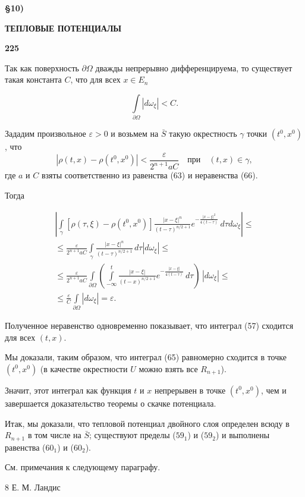 \documentclass[11pt, a4paper]{article}
\begin{document}
	\LARGE
	
	
	\begin{flushleft}
		\textbf{\S10)}
	\end{flushleft}
	
	\vspace*{-40pt}
	\begin{center}
		\textbf{ ТЕПЛОВЫЕ ПОТЕНЦИАЛЫ}\
	\end{center}
	
	\vspace*{-43pt}
	\begin{flushright}
		\textbf{225}
	\end{flushright}
	
	\vspace{0.1cm}
	Так как поверхность $\partial\Omega$ дважды непрерывно дифференцируема, то существует такая константа $C$, что для всех $x \in E_n$
	
	\begin{equation} \tag{66}
		\int\limits_{\partial\Omega} |d\omega_\xi| < C.
	\end{equation}
	
	Зададим произвольное $\varepsilon > 0$ и возьмем на $\bar{S}$ такую окрестность $\gamma$ точки $(t^0 , x^0 )$, что
	\[
	|\rho(t, x) - \rho(t^0 , x^0 )| < \frac{\varepsilon}{2^{n+1} aC} \quad \text{при} \quad (t, x) \in \gamma,
	\]
	 где $a$ и $C$ взяты соответственно из равенства (63) и неравенства (66).
	
	Тогда
	
	\begin{multline*}
		\left|\int\limits_{\gamma} [\rho(\tau, \xi) - \rho(t^0, x^0)]\frac{|x-\xi|^n}{(t-\tau)^{n/2+1}} e^{-\frac{|x-\xi|^2}{4(t-\tau)}} \, d\tau d\omega_\xi \right| \leq  \\
		\leq \frac{\varepsilon}{2^{n + 1}aC} \int\limits_{\gamma} \frac{|x-\xi|^n}{(t-\tau)^{n/2+1}} \, d\tau |d\omega_\xi| \leq \\
		\leq \frac{\varepsilon}{2^{n + 1}aC} \int\limits_{\partial\Omega} \left(\int\limits_{-\infty}^t \frac{|x - \xi|}{(t - x)^{n/2+1}}e^{-\frac{|x - \xi|}{4(t - \tau)}} \, d\tau \right) \, |d\omega_\xi| \leq \\
		\leq \frac{\varepsilon}{C} \int\limits_{\partial\Omega} |d\omega_\xi| = \varepsilon.
	\end{multline*}
	
	Полученное неравенство одновременно показывает, что интеграл (57) сходится для всех $(t,x)$.
	
	Мы доказали, таким образом, что интеграл (65) равномерно сходится в точке $(t^0,x^0)$ (в качестве окрестности $U$ можно взять все $R_{n+1}$).
	
	Значит, этот интеграл как функция $t$ и $x$ непрерывен в точке $(t^0,x^0)$, чем и завершается доказательство теоремы о скачке потенциала.
	
	Итак, мы доказали, что тепловой потенциал двойного слоя определен всюду в $R_{n+1}$ в том числе на $\bar{S}$; существуют пределы ($59_1$) и ($59_2$) и выполнены равенства ($60_1$) и ($60_2$).
	
	\large  См. примечания к следующему параграфу.
	
	\vspace{1cm}
	\large 8 Е. М. Ландис
	
\end{document}
